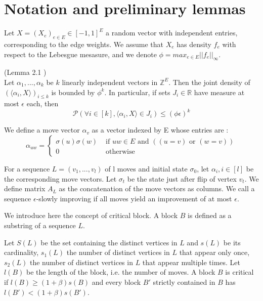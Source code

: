 \section{Notation and preliminary lemmas}

Let $X = (X_e)_{e \in E} \in [-1, 1]^E$ a random vector with independent entries, corresponding to the edge weights. We assume that $X_e$ has density $f_e$ with respect to the Lebesgue mesasure, and we denote $\phi = max_{e \in E}||f_e||_\infty$. 

\begin{lemma} (Lemma 2.1 \cite{angel2016local})\\
\label{noise}
Let $\alpha_1, ..., \alpha_k$ be $k$ linearly independent vectors in $\mathbb{Z}^E$. Then the joint density of$ (\langle \alpha_i, X \rangle)_{i \leq k}$ is bounded by $\phi^k$. In particular, if sets $J_i \in \mathbb R$ have measure at most $\epsilon$ each, then 
\begin{equation*}
\mathcal{P} (\forall i \in [k], \langle \alpha_i, X \rangle \in J_i) \leq (\phi \epsilon)^k
\end{equation*}
\end{lemma}

We define a move vector $\alpha_v$ as a vector indexed by E whose entries are :
\begin{equation*}
\alpha_{uw} = 
\begin{cases}
\sigma(u)\sigma(w) &\text{ if } uw \in E \text{ and }( (u = v) \text{ or } (w = v)) \\
 0 &\text{ otherwise}
 \end{cases}
\end{equation*} 

For a sequence $L = (v_1, ..., v_l)$ of l moves and initial state $\sigma_0$, let $\alpha_i, i \in [l]$ be the corresponding move vectors. Let $\sigma_t$ be the state just after flip of vertex $v_t$. We define matrix $A_L$ as the concatenation of the move vectors as columns. We call a sequence $\epsilon$-slowly improving if all moves yield an improvement of at most $\epsilon$.

We introduce here the concept of critical block. A block $B$ is defined as a substring of a sequence $L$.

Let $S(L)$ be the set containing the distinct vertices in $L$ and $s(L)$ be its cardinality, $s_1(L)$ the number of distinct vertices in $L$ that appear only once, $s_2(L)$ the number of distinct vertices in $L$ that appear multiple times. Let $l(B)$ be the length of the block, i.e. the number of moves.
A block $B$ is critical if $l(B) \geq (1 + \beta)s(B)$ and every block $B'$ strictly contained in $B$ has $l(B') < (1+\beta)s(B')$.

